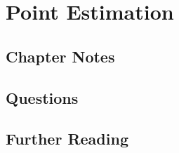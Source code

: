\documentclass[
]{book}
\begin{document}
\hypertarget{point_estimation}{%
\chapter{Point Estimation}\label{point_estimation}}

\hypertarget{chapter-notes-6}{%
\section{Chapter Notes}\label{chapter-notes-6}}

\hypertarget{questions-6}{%
\section{Questions}\label{questions-6}}

\hypertarget{further-reading-6}{%
\section*{Further Reading}\label{further-reading-6}}

  
\end{document}
